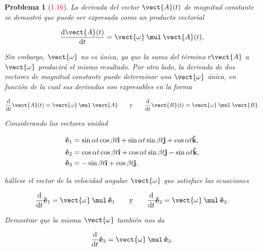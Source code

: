 \documentclass[12pt]{article}
\theoremstyle{break}
\newtheorem{exercise}{Problema}
\theoremstyle{nonumberbreak}
\newcommand*{\uveci}{{\bm{\hat{\textnormal{\bfseries\i}}}}}
\newcommand*{\uvecj}{{\bm{\hat{\textnormal{\bfseries\j}}}}}
\DeclareRobustCommand{\uvec}[1]{{%
  \ifcsname uvec#1\endcsname
     \csname uvec#1\endcsname
   \else
    \bm{\hat{\mathbf{#1}}}%
   \fi
}}%
\newcommand*{\uvectk}{\uvec{k}}
\newcommand*{\crossprod}[2]{#1 \mathbin{\mul} #2\xspace}
\newcommand*{\basevect}[1]{\uvec{e}_{#1}\xspace}
\begin{document}
    \begin{exercise}[\textcolor{red}{1.16}]
      La derivada del vector \(\vect{A}(t)\) de magnitud constante se demostró que puede ser expresada como un producto vectorial
      
      \begin{equation*}
        \odv{\vect{A}(t)}{t} = \crossprod{\vect{\omega}}{\vect{A}(t)},
      \end{equation*}

      Sin embargo, \(\vect{\omega}\) no es única, ya que la suma del término \(c\vect{A}\) a \(\vect{\omega}\) producirá el mismo resultado. Por otro lado, la derivada de dos vectores de magnitud constante puede determinar una \(\vect{\omega}\) única, en función de la cual sus derivadas son expresables en la forma

      \begin{equation*}
        \odv*{\vect{A}(t)}{t} = \crossprod{\vect{\omega}}{\vect{A}}\qquad \text{y} \qquad \odv*{\vect{B}(t)}{t} = \crossprod{\vect{\omega}}{\vect{B}}.
      \end{equation*}

      Considerando los vectores unidad

      \begin{align*}
        \basevect{1} &= \sin\alpha t\cos\beta t\uveci + \sin\alpha t\sin\beta t\uvecj + \cos\alpha t\uvectk,\\
        \basevect{2} &= \cos\alpha t\cos\beta t\uveci + \cos\alpha t\sin\beta t\uvecj - \sin\alpha t\uvectk,\\
        \basevect{3} &= -\sin\beta t\uveci + \cos\beta t\uvecj,
      \end{align*}

      hállese el vector de la velocidad angular \(\vect{\omega}\) que satisface las ecuaciones

      \begin{equation*}
        \odv*{\basevect{1}}{t} = \crossprod{\vect{\omega}}{\basevect{1}}\qquad \text{y} \qquad \odv*{\basevect{2}}{t} = \crossprod{\vect{\omega}}{\basevect{2}}.
      \end{equation*}

      Demostrar que la misma \(\vect{\omega}\) también nos da

      \begin{equation*}
        \odv*{\basevect{3}}{t} = \crossprod{\vect{\omega}}{\basevect{3}}.
      \end{equation*}
    \end{exercise}
    
\end{document}
